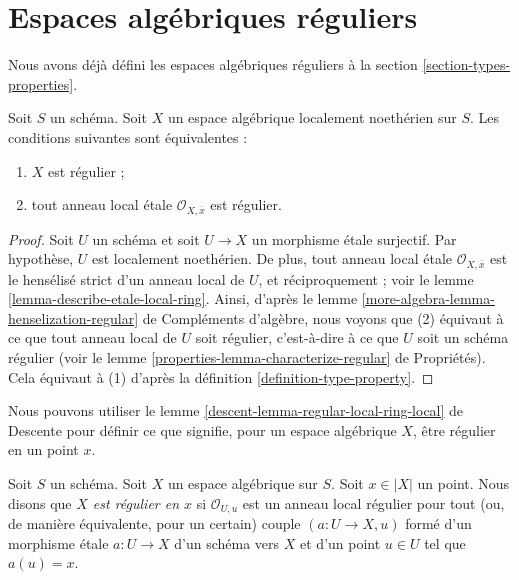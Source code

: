 \section{Espaces algébriques réguliers}
\label{section-regular}

\noindent
Nous avons déjà défini les espaces algébriques réguliers à la
section \ref{section-types-properties}.

\begin{lemma}
\label{lemma-regular}
Soit $S$ un schéma.
Soit $X$ un espace algébrique localement noethérien sur $S$.
Les conditions suivantes sont équivalentes :
\begin{enumerate}
\item $X$ est régulier ;
\item tout anneau local \'etale $\mathcal{O}_{X, \overline{x}}$ est
régulier.
\end{enumerate}
\end{lemma}

\begin{proof}
Soit $U$ un schéma et soit $U \to X$ un morphisme \'etale surjectif.
Par hypothèse, $U$ est localement noethérien. De plus, tout anneau local \'etale
$\mathcal{O}_{X, \overline{x}}$ est le hensélisé strict d'un
anneau local de $U$, et réciproquement ; voir le
lemme \ref{lemma-describe-etale-local-ring}.
Ainsi, d'après le
lemme \ref{more-algebra-lemma-henselization-regular} de Compléments d'algèbre,
nous voyons que (2) équivaut à ce que tout anneau local de $U$ soit
régulier, c'est-à-dire à ce que $U$ soit un schéma régulier (voir le
lemme \ref{properties-lemma-characterize-regular} de Propriétés).
Cela équivaut à (1) d'après la
définition \ref{definition-type-property}.
\end{proof}

\noindent
Nous pouvons utiliser le lemme \ref{descent-lemma-regular-local-ring-local}
de Descente pour définir ce que signifie, pour un espace algébrique $X$, être
régulier en un point $x$.

\begin{definition}
\label{definition-regular-at-point}
Soit $S$ un schéma. Soit $X$ un espace algébrique sur $S$.
Soit $x \in |X|$ un point. Nous disons que {\it $X$ est régulier en $x$}
si $\mathcal{O}_{U, u}$ est un anneau local régulier pour tout
(ou, de manière équivalente, pour un certain) couple $(a : U \to X, u)$ formé d'un
morphisme \'etale $a : U \to X$ d'un schéma vers $X$ et d'un point
$u \in U$ tel que $a(u) = x$.
\end{definition}

